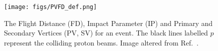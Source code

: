 \begin{figure}[!h]
  \centering
  \texttt{[image: figs/PVFD\_def.png]} 
  \caption{The Flight Distance (FD), Impact Parameter (\Gls{IP}) and Primary and Secondary Vertices (PV, SV) for an event. The black lines labelled $p$ represent the colliding proton beams. Image altered from Ref.~\cite{Sam}.}
  \label{fig:IPFD}
\end{figure}









 


